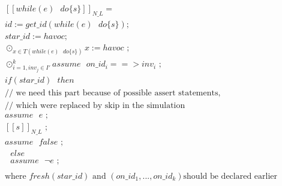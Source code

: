 \documentclass[a4paper,12pt]{article}
\begin{document}
	\begin{equation*}
	\begin{multlined}
		[[while(e) \text{ } do\{s\}]]_{N\_L} = \\
		id := get\_id(while(e) \text{ } do\{s\}); \\
		star\_id := havoc; \\
		\odot_{x \in T(while(e) \text{ } do\{s\})}
		x := havoc \text{ ;} \\
		\odot^k_{i=1, inv_j \in I'} 
		assume \text{ } on\_id_i ==> inv_i \text{ ;} \\
		if(star\_id) \text{ } then \text{ } \\
		\text{// we need this part 
			because of possible assert statements,} \\
		\text{// which were replaced by skip in the simulation} \\
		assume \text{ } e \text{ ;} \\
		[[s]]_{N\_L} \text{ ; } \\
		assume \text{ } false \text{ ;}\\
		\text{ } else \\
		\text{ } assume \text{ } \lnot e \text{ ;} \\		
		\\
		\text{where $fresh(star\_id)$ and $(on\_id_1,...,on\_id_k)$
			 should be declared earlier}		
	\end{multlined}
	\end{equation*}
	\\
	
\end{document}
